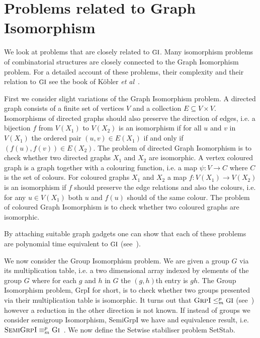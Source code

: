 \documentclass[11pt]{madras}%
\theoremstyle{remark}
\newcommand{\etal}[0]{{\emph{et al}}}
\newcommand{\ProblemFont}[1]{{\ensuremath{\textrm{\small #1}}}}
\begin{document}
\section{Problems related to Graph Isomorphism}

We look at problems that are closely related to $\ProblemFont{GI}$.
Many isomorphism problems of combinatorial structures are closely
connected to the Graph Isomorphism problem.  For a detailed account of
these problems, their complexity and their relation to
$\ProblemFont{GI}$ see the book of K\"obler \etal~\cite[Chapter
1]{gi-book}.

First we consider slight variations of the Graph Isomorphism problem.
A directed graph consists of a finite set of vertices $V$ and a
collection $E \subseteq V \times V$. Isomorphisms of directed graphs
should also preserve the direction of edges, i.e. a bijection $f$ from
$V(X_1)$ to $V(X_2)$ is an isomorphism if for all $u$ and $v$ in
$V(X_1)$ the ordered pair $(u,v) \in E(X_1)$ if and only if
$(f(u),f(v)) \in E(X_2)$. The problem of directed Graph Isomorphism is
to check whether two directed graphs $X_1$ and $X_2$ are isomorphic.
A vertex coloured graph is a graph together with a colouring function,
i.e. a map $\psi : V \to C$ where $C$ is the set of colours. For
coloured graphs $X_1$ and $X_2$ a map $f : V(X_1) \to V(X_2)$ is an
isomorphism if $f$ should preserve the edge relations and also the
colours, i.e. for any $u \in V(X_1)$ both $u$ and $f(u)$ should of the
same colour.  The problem of coloured Graph Isomorphism is to check
whether two coloured graphs are isomorphic.

By attaching suitable graph gadgets one can show that each of these
problems are polynomial time equivalent to $\ProblemFont{GI}$
(see~\cite{miller79graph}).

We now consider the Group Isomorphism problem. We are given a group
$G$ via its multiplication table, i.e. a two dimensional array indexed
by elements of the group $G$ where for each $g$ and $h$ in $G$ the
$(g,h)$th entry is $gh$. The Group Isomorphism problem, {\sc GrpI} for
short, is to check whether two groups presented via their
multiplication table is isomorphic. It turns out that $\textrm{\sc
  GrpI} \leq_m^p \ProblemFont{GI}$ (see~\cite{miller79graph}) however a
reduction in the other direction is not known. If instead of groups we
consider semigroup Isomorphism, {\sc SemiGrpI} we have and equivalence
result, i.e.  $\textrm{\sc SemiGrpI} \equiv_m^p \textrm{\sc
  Gi}$~\cite{booth78isomorphism}.  We now define the Setwise
stabiliser problem {\sc SetStab}.
\end{document}
